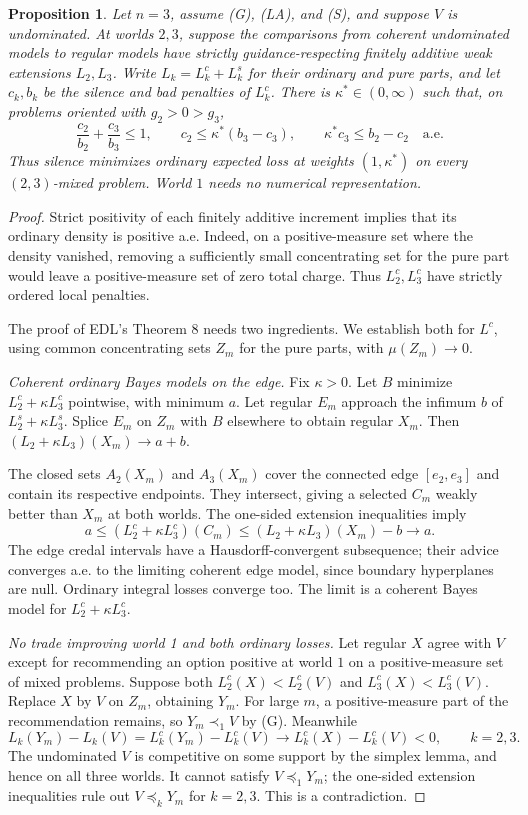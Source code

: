 \documentclass[11pt]{article}
\newtheorem{proposition}[theorem]{Proposition}
\theoremstyle{remark}\newtheorem{remark}[theorem]{Remark}
\begin{document}
\begin{proposition}\label{prop:two-worlds}
Let $n=3$, assume (G), (LA), and (S), and suppose $V$ is undominated.
At worlds $2,3$, suppose the comparisons from coherent undominated models
to regular models have strictly guidance-respecting finitely additive weak
extensions $L_2,L_3$. Write $L_k=L_k^c+L_k^s$ for their ordinary and pure
parts, and let $c_k,b_k$ be the silence and bad penalties of $L_k^c$.
There is $\kappa^*\in(0,\infty)$ such that, on problems oriented with
$g_2>0>g_3$,
\[
 \frac{c_2}{b_2}+\frac{c_3}{b_3}\le1,\qquad
 c_2\le\kappa^*(b_3-c_3),\qquad
 \kappa^*c_3\le b_2-c_2
 \quad\text{a.e.}
\]
Thus silence minimizes ordinary expected loss at weights $(1,\kappa^*)$
on every $(2,3)$-mixed problem. World $1$ needs no numerical representation.
\end{proposition}
\begin{proof}
Strict positivity of each finitely additive increment implies that its
ordinary density is positive a.e. Indeed, on a positive-measure set where
the density vanished, removing a sufficiently small concentrating set for
the pure part would leave a positive-measure set of zero total charge.
Thus $L_2^c,L_3^c$ have strictly ordered local penalties.

The proof of EDL's Theorem 8 needs two ingredients. We establish both for
$L^c$, using common concentrating sets $Z_m$ for the pure parts, with
$\mu(Z_m)\to0$.

\emph{Coherent ordinary Bayes models on the edge.} Fix $\kappa>0$.
Let $B$ minimize $L_2^c+\kappa L_3^c$ pointwise, with minimum $a$.
Let regular $E_m$ approach the infimum $b$ of $L_2^s+\kappa L_3^s$.
Splice $E_m$ on $Z_m$ with $B$ elsewhere to obtain regular $X_m$.
Then $(L_2+\kappa L_3)(X_m)\to a+b$.

The closed sets $A_2(X_m)$ and $A_3(X_m)$ cover the connected edge
$[e_2,e_3]$ and contain its respective endpoints. They intersect, giving
a selected $C_m$ weakly better than $X_m$ at both worlds. The one-sided
extension inequalities imply
\[
 a\le(L_2^c+\kappa L_3^c)(C_m)
 \le(L_2+\kappa L_3)(X_m)-b\longrightarrow a.
\]
The edge credal intervals have a Hausdorff-convergent subsequence; their
advice converges a.e. to the limiting coherent edge model, since boundary
hyperplanes are null. Ordinary integral losses converge too. The limit
is a coherent Bayes model for $L_2^c+\kappa L_3^c$.

\emph{No trade improving world 1 and both ordinary losses.}
Let regular $X$ agree with $V$ except for recommending an option positive
at world $1$ on a positive-measure set of mixed problems. Suppose both
$L_2^c(X)<L_2^c(V)$ and $L_3^c(X)<L_3^c(V)$.
Replace $X$ by $V$ on $Z_m$, obtaining $Y_m$. For large $m$, a
positive-measure part of the recommendation remains, so $Y_m\prec_1V$
by (G). Meanwhile
\[
 L_k(Y_m)-L_k(V)
   =L_k^c(Y_m)-L_k^c(V)
   \longrightarrow L_k^c(X)-L_k^c(V)<0,\qquad k=2,3.
\]
The undominated $V$ is competitive on some support by the simplex lemma,
and hence on all three worlds. It cannot satisfy $V\preceq_1Y_m$; the
one-sided extension inequalities rule out $V\preceq_kY_m$ for $k=2,3$.
This is a contradiction.


\end{proof}
\end{document}
